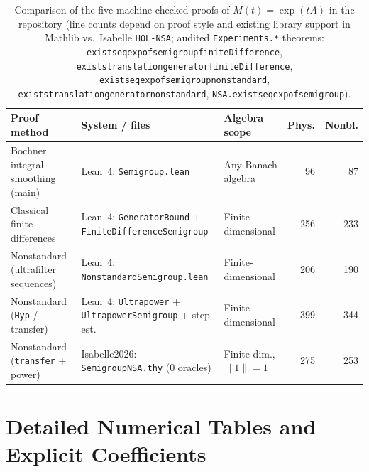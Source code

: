 \documentclass[11pt,a4paper]{article}
\theoremstyle{plain}
\theoremstyle{definition}
\DeclareRobustCommand{\leanid}[1]{{\def\_{\textunderscore\allowbreak}\texttt{#1}}}
\begin{document}
\begin{table}[!htbp]
\centering
\caption{Comparison of the five machine-checked proofs of $M(t) = \exp(tA)$ in the repository (line counts depend on proof style and existing library support in Mathlib vs.\ Isabelle \texttt{HOL-NSA}; audited \texttt{Experiments.*} theorems: \leanid{exists\_eq\_exp\_of\_semigroup\_finite\allowbreak Difference}, \leanid{exists\_translation\_generator\_finite\allowbreak Difference}, \leanid{exists\_eq\_exp\_of\_semigroup\_nonstandard}, \leanid{exists\_translation\_generator\_nonstandard}, \leanid{NSA.exists\_eq\_exp\_of\_semigroup}).}\label{tab:semigroup_comp}
\smallskip
{\scriptsize\setlength{\tabcolsep}{2.4pt}
\begin{tabular}{@{}l>{\raggedright\arraybackslash}p{4.8cm}lrr@{}}
\toprule
Proof method & System / files & Algebra scope & Phys. & Nonbl. \\
\midrule
Bochner integral smoothing (main) & Lean~4: \texttt{Semigroup.lean} & Any Banach algebra & 96 & 87 \\
Classical finite differences & Lean~4: \texttt{GeneratorBound} + \texttt{FiniteDifferenceSemigroup} & Finite-dimensional & 256 & 233 \\
Nonstandard (ultrafilter sequences) & Lean~4: \texttt{NonstandardSemigroup.lean} & Finite-dimensional & 206 & 190 \\
Nonstandard (\texttt{Hyp} / transfer) & Lean~4: \texttt{Ultrapower} + \texttt{UltrapowerSemigroup} + step est. & Finite-dimensional & 399 & 344 \\
Nonstandard (\texttt{transfer} + power) & Isabelle2026: \leanid{Semigroup\_NSA.thy} ($0$ oracles) & Finite-dim., $\|1\|{=}1$ & 275 & 253 \\
\bottomrule
\end{tabular}}
\end{table}

\section{Detailed Numerical Tables and Explicit Coefficients}\label{app:tables}\label{app:params}
\end{document}
